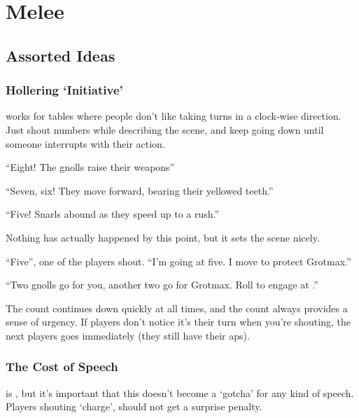 \pagebreak[2]
\section{Melee}

\begin{multicols}{2}

\subsection{Assorted Ideas}

\subsubsection{Hollering `Initiative'}
works for tables where people don't like taking turns in a clock-wise direction.
Just shout numbers while describing the scene, and keep going down until someone interrupts with their action.

\begin{speechtext}

``Eight! The gnolls raise their weapons''

``Seven, six! They move forward, bearing their yellowed teeth.''

``Five! Snarls abound as they speed up to a rush.''

\end{speechtext}

Nothing has actually happened by this point, but it sets the scene nicely.

\begin{speechtext}

  ``Five'', one of the players shout.
  ``I'm going at five.
  I move to protect Grotmax.''

  ``Two gnolls go for you, another two go for Grotmax.
  Roll to engage at \tn[11].''

\end{speechtext}

The count continues down quickly at all times, and the count always provides a sense of urgency.
If players don't notice it's their turn when you're shouting, the next players goes immediately (they still have their \glspl{ap}).

\subsubsection{The Cost of Speech}
is , but it's important that this doesn't become a `gotcha' for any kind of speech.
Players shouting `charge', should not get a surprise penalty.


\end{multicols}
